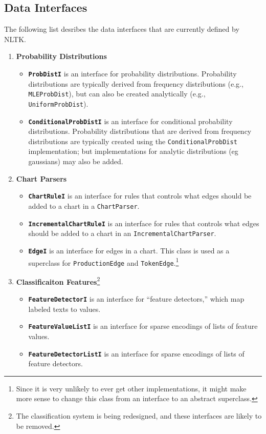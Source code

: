 \documentclass[11pt]{article}
\begin{document}
\subsection{Data Interfaces}

The following list desribes the data interfaces that are currently
defined by NLTK.

\begin{enumerate}
\item \textbf{Probability Distributions}
  \begin{itemize}
  \item \textbf{\texttt{ProbDistI}} is an interface for probability
    distributions.  Probability distributions are typically derived
    from frequency distributions (e.g., \texttt{MLEProbDist}), but can
    also be created analytically (e.g., \texttt{UniformProbDist}).
  \item \textbf{\texttt{ConditionalProbDistI}} is an interface for
    conditional probability distributions.  Probability distributions
    that are derived from frequency distributions are typically
    created using the \texttt{ConditionalProbDist} implementation; but
    implementations for analytic distributions (eg gaussians) may also
    be added.
  \end{itemize}
\newpage
\item \textbf{Chart Parsers}
  \begin{itemize}
  \item \textbf{\texttt{ChartRuleI}} is an interface for rules that
    controls what edges should be added to a chart in a
    \texttt{ChartParser}.
  \item \textbf{\texttt{IncrementalChartRuleI}} is an interface for
    rules that controls what edges should be added to a chart in an
    \texttt{IncrementalChartParser}.
  \item \textbf{\texttt{EdgeI}} is an interface for edges in a chart.
    This class is used as a superclass for \texttt{ProductionEdge} and
    \texttt{TokenEdge}.\footnote{Since it is very unlikely to ever get
      other implementations, it might make more sense to change this
      class from an interface to an abstract superclass.}
  \end{itemize}
\item \textbf{Classificaiton Features}\footnote{The classification
    system is being redesigned, and these interfaces are likely to be
    removed.}
  \begin{itemize}
  \item \textbf{\texttt{FeatureDetectorI}} is an interface for
    ``feature detectors,'' which map labeled texts to values.
  \item \textbf{\texttt{FeatureValueListI}} is an interface for sparse
    encodings of lists of feature values.
  \item \textbf{\texttt{FeatureDetectorListI}} is an interface for
    sparse encodings of lists of feature detectors.
  \end{itemize}
\end{enumerate}
\end{document}
